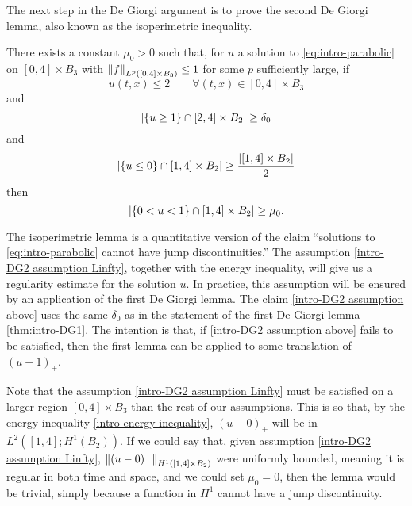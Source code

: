 The next step in the De Giorgi argument is to prove the second De Giorgi lemma, also known as the isoperimetric inequality.  
\begin{lemma} \label{thm:intro-DG2}
There exists a constant $\mu_0 > 0$ such that, for $u$ a solution to \eqref{eq:intro-parabolic} on $[0,4]\times B_3$ with $\left\lVert f\right\rVert_{L^p([0,4]\times B_3)} \leq 1$ for some $p$ sufficiently large, if
\begin{equation} \label{intro-DG2 assumption Linfty} u(t,x) \leq 2 \qquad \forall (t,x) \in [0,4] \times B_3 \end{equation}
and
\begin{equation} \label{intro-DG2 assumption above} \left\lvert \{u \geq 1\} \cap [2,4] \times B_2 \right\rvert \geq \delta_0 \end{equation}
and
\begin{equation} \label{intro-DG2 assumption below} \left\lvert \{u \leq 0\} \cap [1,4] \times B_2 \right\rvert \geq \frac{\left\lvert [1,4]\times B_2 \right\rvert}{2} \end{equation}
then
\begin{equation} \label{intro-DG2 assumption middle} \left\lvert \{0 < u < 1\} \cap [1,4] \times B_2 \right\rvert \geq \mu_0. \end{equation}
\end{lemma}

The isoperimetric lemma is a quantitative version of the claim ``solutions to \eqref{eq:intro-parabolic} cannot have jump discontinuities.''  The assumption \eqref{intro-DG2 assumption Linfty}, together with the energy inequality, will give us a regularity estimate for the solution $u$.  In practice, this assumption will be ensured by an application of the first De Giorgi lemma.  The claim \eqref{intro-DG2 assumption above} uses the same $\delta_0$ as in the statement of the first De Giorgi lemma \ref{thm:intro-DG1}.  The intention is that, if \eqref{intro-DG2 assumption above} fails to be satisfied, then the first lemma can be applied to some translation of $(u-1)_+$.  

Note that the assumption \eqref{intro-DG2 assumption Linfty} must be satisfied on a larger region $[0,4]\times B_3$ than the rest of our assumptions.  This is so that, by the energy inequality \eqref{intro-energy inequality}, $(u-0)_+$ will be in $L^2([1,4]; H^1(B_2))$.  If we could say that, given assumption \eqref{intro-DG2 assumption Linfty}, $\left\lVert(u-0)_+\right\rVert_{H^1([1,4] \times B_2)}$ were uniformly bounded, meaning it is regular in both time and space, and we could set $\mu_0 = 0$, then the lemma would be trivial, simply because a function in $H^1$ cannot have a jump discontinuity.  

